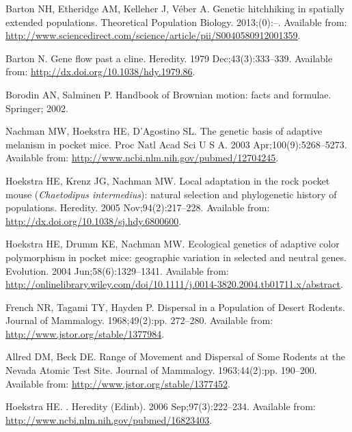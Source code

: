 \documentclass[10pt,letterpaper]{article}
\begin{document}
\begin{thebibliography}{10}
Barton NH, Etheridge AM, Kelleher J, Véber A.
\newblock Genetic hitchhiking in spatially extended populations.
\newblock Theoretical Population Biology. 2013;(0):--.
\newblock Available from:
  \url{http://www.sciencedirect.com/science/article/pii/S0040580912001359}.

Barton N.
\newblock Gene flow past a cline.
\newblock Heredity. 1979 Dec;43(3):333--339.
\newblock Available from: \url{http://dx.doi.org/10.1038/hdy.1979.86}.

Borodin AN, Salminen P.
\newblock Handbook of Brownian motion: facts and formulae.
\newblock Springer; 2002.

Nachman MW, Hoekstra HE, D'Agostino SL.
\newblock The genetic basis of adaptive melanism in pocket mice.
\newblock Proc Natl Acad Sci U S A. 2003 Apr;100(9):5268--5273.
\newblock Available from: \url{http://www.ncbi.nlm.nih.gov/pubmed/12704245}.

Hoekstra HE, Krenz JG, Nachman MW.
\newblock Local adaptation in the rock pocket mouse (\textit{{Chaetodipus}
  intermedius}): natural selection and phylogenetic history of populations.
\newblock Heredity. 2005 Nov;94(2):217--228.
\newblock Available from: \url{http://dx.doi.org/10.1038/sj.hdy.6800600}.

Hoekstra HE, Drumm KE, Nachman MW.
\newblock Ecological genetics of adaptive color polymorphism in pocket mice:
  geographic variation in selected and neutral genes.
\newblock Evolution. 2004 Jun;58(6):1329--1341.
\newblock Available from:
  \url{http://onlinelibrary.wiley.com/doi/10.1111/j.0014-3820.2004.tb01711.x/abstract}.

French NR, Tagami TY, Hayden P.
\newblock Dispersal in a Population of Desert Rodents.
\newblock Journal of Mammalogy. 1968;49(2):pp. 272--280.
\newblock Available from: \url{http://www.jstor.org/stable/1377984}.

Allred DM, Beck DE.
\newblock Range of Movement and Dispersal of Some Rodents at the {Nevada}
  Atomic Test Site.
\newblock Journal of Mammalogy. 1963;44(2):pp. 190--200.
\newblock Available from: \url{http://www.jstor.org/stable/1377452}.

Hoekstra HE.
.
\newblock Heredity (Edinb). 2006 Sep;97(3):222--234.
\newblock Available from: \url{http://www.ncbi.nlm.nih.gov/pubmed/16823403}.


\end{thebibliography}
\end{document}
